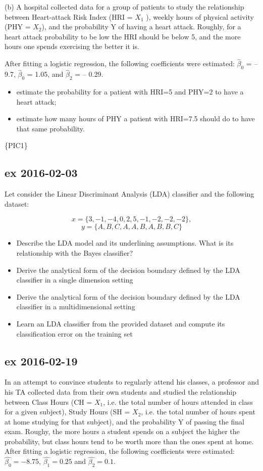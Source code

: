 \documentclass[a4paper,12pt,titlepage]{article} %
\begin{document}
(b) A hospital collected data for a group of patients to study the relationship between Heart-attack Risk Index (HRI = $X_{1}$ ), weekly hours of physical activity (PHY = $X_{2}$), and the probability Y of having a heart attack. Roughly, for a heart attack probability to be low the HRI should be below 5, and the more hours one spends exercising the better it is.

After fitting a logistic regression, the following coefficients were estimated: $ \hat{\beta}_{0} $ = --9.7, $ \hat{\beta}_{0} $ = 1.05, and $ \hat{\beta}_{2} $ = -- 0.29.
\begin{itemize}
\item  estimate the probability for a patient with HRI=5 and PHY=2 to have a heart attack;
\item estimate how many hours of PHY a patient with HRI=7.5 should do to have that same probability.
\end{itemize}
\{PIC1\}

\subsection{ex 2016-02-03}
Let consider the Linear Discriminant Analysis (LDA) classifier and the following dataset:

$$ x = \{ 3, -1, -4, 0, 2, 5, -1, -2, -2, -2 \}, $$
$$ y = \{ A, B, C, A, A, B, A, B, B, C \} $$

\begin{itemize}
\item Describe the LDA model and its underlining assumptions. What is its relationship with the Bayes classifier?
\item Derive the analytical form of the decision boundary defined by the LDA classifier in a single dimension setting
\item Derive the analytical form of the decision boundary defined by the LDA classifier in a multidimensional setting
\item Learn an LDA classifier from the provided dataset and compute its classification error on the training set
\end{itemize}

\subsection{ex 2016-02-19}
In an attempt to convince students to regularly attend his classes, a professor and his TA collected data from their own students and studied the relationship between Class Hours (CH = $ X_{1} $, i.e. the total number of hours attended in class for a given subject), Study Hours (SH = $ X_{2} $, i.e. the total number of hours spent at home studying for that subject), and the probability Y of passing the final exam. Roughy, the more hours a student spends on a subject the higher the probability, but class hours tend to be worth more than the ones spent at home. After fitting a logistic regression, the following coefficients were estimated: $ \hat{\beta_{0}} = -8.75 $, $ \hat{\beta_{1}} = 0.25 $ and $ \hat{\beta_{2}} = 0.1 $.
\end{document}
